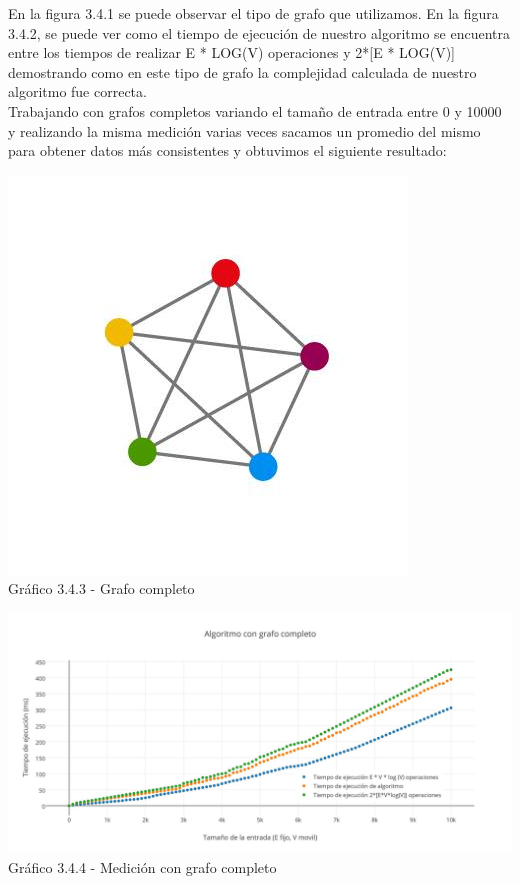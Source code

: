 En la figura 3.4.1 se puede observar el tipo de grafo que utilizamos. En la figura 3.4.2, se puede ver como el tiempo de ejecución de nuestro algoritmo se encuentra entre los tiempos de realizar E * LOG(V) operaciones y 2*[E * LOG(V)] demostrando como en este 
tipo de grafo la complejidad calculada de nuestro algoritmo fue correcta.\\




Trabajando con grafos completos variando el tamaño de entrada entre 0 y 10000 y realizando la misma medición varias veces sacamos un promedio del mismo para obtener datos más consistentes y obtuvimos el siguiente resultado:

\vspace*{0.3cm} \vspace*{0.3cm}
  \begin{center}
 \includegraphics[scale=0.5]{./ej3/completo.jpg}
 	{\\Gráfico 3.4.3 - Grafo completo}
  \end{center}
  \vspace*{0.3cm}
  
  \vspace*{0.3cm} \vspace*{0.3cm}
  \begin{center}
 \includegraphics[scale=0.28]{./ej3/completo2.jpg}
 	{Gráfico 3.4.4 - Medición con grafo completo}
  \end{center}
  \vspace*{0.3cm}


